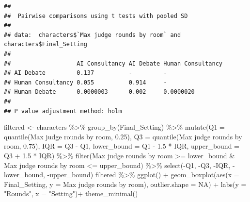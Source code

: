 \documentclass[
]{article}
\newenvironment{Shaded}{\begin{snugshade}}{\end{snugshade}}
\newcommand{\AttributeTok}[1]{\textcolor[rgb]{0.77,0.63,0.00}{#1}}
\newcommand{\ConstantTok}[1]{\textcolor[rgb]{0.00,0.00,0.00}{#1}}
\newcommand{\FloatTok}[1]{\textcolor[rgb]{0.00,0.00,0.81}{#1}}
\newcommand{\FunctionTok}[1]{\textcolor[rgb]{0.00,0.00,0.00}{#1}}
\newcommand{\NormalTok}[1]{#1}
\newcommand{\OtherTok}[1]{\textcolor[rgb]{0.56,0.35,0.01}{#1}}
\newcommand{\SpecialCharTok}[1]{\textcolor[rgb]{0.00,0.00,0.00}{#1}}
\newcommand{\StringTok}[1]{\textcolor[rgb]{0.31,0.60,0.02}{#1}}
\begin{document}
\begin{verbatim}
## 
##  Pairwise comparisons using t tests with pooled SD 
## 
## data:  characters$`Max judge rounds by room` and characters$Final_Setting 
## 
##                   AI Consultancy AI Debate Human Consultancy
## AI Debate         0.137          -         -                
## Human Consultancy 0.055          0.914     -                
## Human Debate      0.0000003      0.002     0.0000020        
## 
## P value adjustment method: holm
\end{verbatim}

\begin{Shaded}
\begin{Highlighting}[]
\NormalTok{filtered }\OtherTok{\textless{}{-}}\NormalTok{ characters }\SpecialCharTok{\%\textgreater{}\%}
  \FunctionTok{group\_by}\NormalTok{(Final\_Setting) }\SpecialCharTok{\%\textgreater{}\%}
  \FunctionTok{mutate}\NormalTok{(}\AttributeTok{Q1 =} \FunctionTok{quantile}\NormalTok{(}\StringTok{\textasciigrave{}}\AttributeTok{Max judge rounds by room}\StringTok{\textasciigrave{}}\NormalTok{, }\FloatTok{0.25}\NormalTok{),}
         \AttributeTok{Q3 =} \FunctionTok{quantile}\NormalTok{(}\StringTok{\textasciigrave{}}\AttributeTok{Max judge rounds by room}\StringTok{\textasciigrave{}}\NormalTok{, }\FloatTok{0.75}\NormalTok{),}
         \AttributeTok{IQR =}\NormalTok{ Q3 }\SpecialCharTok{{-}}\NormalTok{ Q1,}
         \AttributeTok{lower\_bound =}\NormalTok{ Q1 }\SpecialCharTok{{-}} \FloatTok{1.5} \SpecialCharTok{*}\NormalTok{ IQR,}
         \AttributeTok{upper\_bound =}\NormalTok{ Q3 }\SpecialCharTok{+} \FloatTok{1.5} \SpecialCharTok{*}\NormalTok{ IQR) }\SpecialCharTok{\%\textgreater{}\%}
  \FunctionTok{filter}\NormalTok{(}\StringTok{\textasciigrave{}}\AttributeTok{Max judge rounds by room}\StringTok{\textasciigrave{}} \SpecialCharTok{\textgreater{}=}\NormalTok{ lower\_bound }\SpecialCharTok{\&} \StringTok{\textasciigrave{}}\AttributeTok{Max judge rounds by room}\StringTok{\textasciigrave{}} \SpecialCharTok{\textless{}=}\NormalTok{ upper\_bound) }\SpecialCharTok{\%\textgreater{}\%}
  \FunctionTok{select}\NormalTok{(}\SpecialCharTok{{-}}\NormalTok{Q1, }\SpecialCharTok{{-}}\NormalTok{Q3, }\SpecialCharTok{{-}}\NormalTok{IQR, }\SpecialCharTok{{-}}\NormalTok{lower\_bound, }\SpecialCharTok{{-}}\NormalTok{upper\_bound)}
\NormalTok{filtered }\SpecialCharTok{\%\textgreater{}\%}
  \FunctionTok{ggplot}\NormalTok{() }\SpecialCharTok{+}
  \FunctionTok{geom\_boxplot}\NormalTok{(}\FunctionTok{aes}\NormalTok{(}\AttributeTok{x =}\NormalTok{ Final\_Setting, }\AttributeTok{y =} \StringTok{\textasciigrave{}}\AttributeTok{Max judge rounds by room}\StringTok{\textasciigrave{}}\NormalTok{), }\AttributeTok{outlier.shape =} \ConstantTok{NA}\NormalTok{) }\SpecialCharTok{+}
  \FunctionTok{labs}\NormalTok{(}\AttributeTok{y =} \StringTok{"Rounds"}\NormalTok{, }\AttributeTok{x =} \StringTok{"Setting"}\NormalTok{)}\SpecialCharTok{+}
  \FunctionTok{theme\_minimal}\NormalTok{()}
\end{Highlighting}
\end{Shaded}
\end{document}

